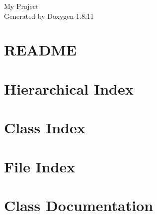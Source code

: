 \documentclass[twoside]{book}
\newcommand{\+}{\discretionary{\mbox{\scriptsize$\hookleftarrow$}}{}{}}
\newcommand{\clearemptydoublepage}{%
  \newpage{\pagestyle{empty}\cleardoublepage}%
}
\begin{document}
\hypersetup{pageanchor=false,
             bookmarksnumbered=true,
             pdfencoding=unicode
            }
\begin{titlepage}
\vspace*{7cm}
\begin{center}%
{\Large My Project }\\
\vspace*{1cm}
{\large Generated by Doxygen 1.8.11}\\
\end{center}
\end{titlepage}
\clearemptydoublepage
\tableofcontents
\clearemptydoublepage
{}
\hypersetup{pageanchor=true}

\chapter{R\+E\+A\+D\+ME}
\label{md_README}
\hypertarget{md_README}{}

\chapter{Hierarchical Index}

\chapter{Class Index}

\chapter{File Index}

\chapter{Class Documentation}


















































\end{document}
